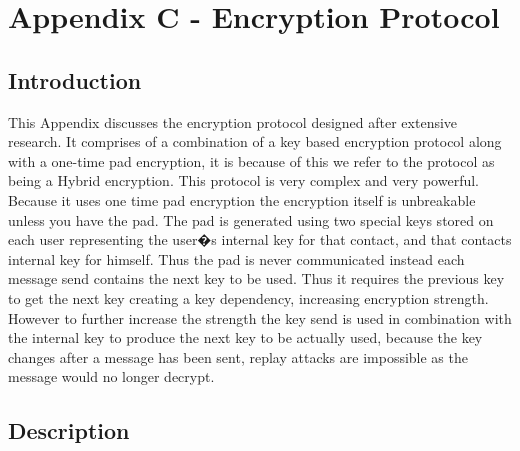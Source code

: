 \section{Appendix C - Encryption Protocol}

\subsection*{Introduction}

This Appendix discusses the encryption protocol designed after extensive research. It comprises of a combination of a key based encryption protocol along with a one-time pad encryption, it is because of this we refer to the protocol as being a Hybrid encryption. This protocol is very complex and very powerful. Because it uses one time pad encryption the encryption itself is unbreakable unless you have the pad. The pad is generated using two special keys stored on each user representing the user�s internal key for that contact, and that contacts internal key for himself. Thus the pad is never communicated instead each message send contains the next key to be used. Thus it requires the previous key to get the next key creating a key dependency, increasing encryption strength. However to further increase the strength the key send is used in combination with the internal key to produce the next key to be actually used, because the key changes after a message has been sent, replay attacks are impossible as the message would no longer decrypt.

\subsection*{Description}

